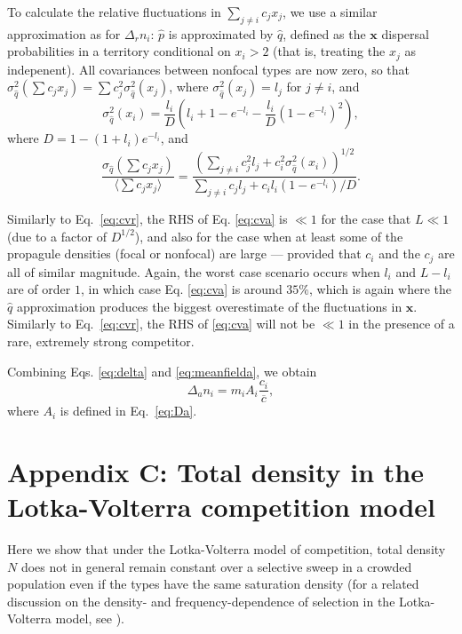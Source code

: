 \documentclass[11pt]{article}
\begin{document}
To calculate the relative fluctuations in $\sum_{j\neq i} c_j x_j$, we use a similar approximation as for $\Delta_r n_i$: $\hat{p}$ is approximated by $\hat{q}$, defined as the ${\mathbf x}$ dispersal probabilities in a territory conditional on $x_i>2$ (that is, treating the $x_j$ as indepenent). All covariances between nonfocal types are now zero, so that $\sigma_{\hat{q}}^2(\sum c_j x_j)=\sum c_j^2 \sigma_{\hat{q}}^2(x_j)$, where $\sigma_{\hat{q}}^2(x_j)=l_j$ for $j\neq i$, and  
\begin{equation}
\sigma_{\hat{q}}^2(x_i)=\frac{l_i}{D}\left(l_i+1-e^{-l_i}-\frac{l_i}{D}\left(1-e^{-l_i}\right)^2\right),
\end{equation}
where $D= 1-(1+l_i)e^{-l_i}$, and 
\begin{equation}
\frac{\sigma_{\hat{q}}(\sum c_j x_j)}{\langle\sum c_j x_j\rangle} = \frac{\left(\sum_{j\neq i} c_j^2 l_j + c_i^2 \sigma_{\hat{q}}^2(x_i)\right)^{1/2}}{\sum_{j\neq i} c_j l_j + c_i l_i (1-e^{-l_i})/D} \label{eq:cva}.
\end{equation}

Similarly to Eq.~\eqref{eq:cvr}, the RHS of Eq. \eqref{eq:cva} is $\ll 1$ for the case that $L \ll 1$ (due to a factor of $D^{1/2}$), and also for the case when at least some of the propagule densities (focal or nonfocal) are large --- provided that $c_i$ and the $c_j$ are all of similar magnitude. Again, the worst case scenario occurs when $l_i$ and $L-l_i$ are of order $1$, in which case Eq. \eqref{eq:cva} is around $35\%$, which is again where the $\hat{q}$ approximation produces the biggest overestimate of the fluctuations in ${\mathbf x}$. Similarly to Eq.~\eqref{eq:cvr}, the RHS of \eqref{eq:cva} will not be $\ll 1$ in the presence of a rare, extremely strong competitor.  

Combining Eqs. \eqref{eq:delta} and \eqref{eq:meanfielda}, we obtain
\begin{equation}
\Delta_a n_i=m_i A_i \frac{c_i}{\overline{c}},
\end{equation}
where $A_i$ is defined in Eq.~\eqref{eq:Da}.

\section*{Appendix C: Total density in the Lotka-Volterra competition model}

Here we show that under the Lotka-Volterra model of competition, total density $N$ does not in general remain constant over a selective sweep in a crowded population even if the types have the same saturation density (for a related discussion on the density- and frequency-dependence of selection in the Lotka-Volterra model, see \citep{smouse_1976,mallet_2012}).
\end{document}
